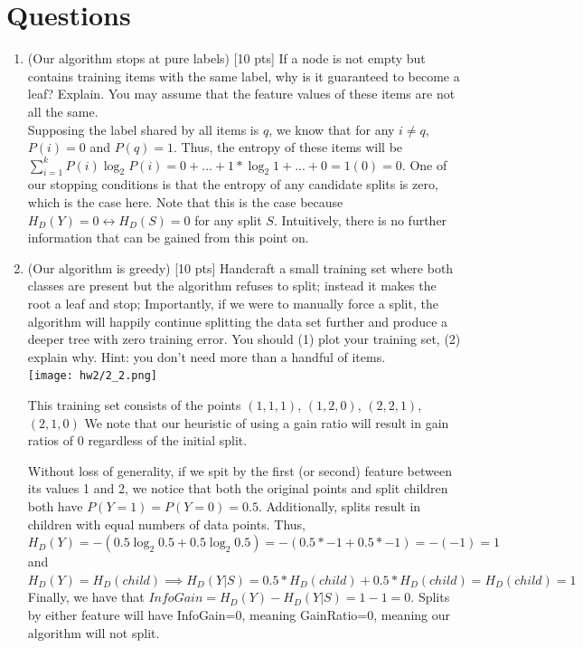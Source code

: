 \documentclass[a4paper]{article}
\theoremstyle{definition}
\begin{document}
\section{Questions}
\begin{enumerate}
\item (Our algorithm stops at pure labels) [10 pts] If a node is not empty but contains training items with the same label, why is it guaranteed to become a leaf?  Explain. You may assume that the feature values of these items are not all the same. \\

Supposing the label shared by all items is $q$, we know that for any $i \neq q$, $P(i) = 0$ and $P(q) = 1$. Thus, the entropy of these items will be $\sum_{i=1}^{k} P(i) \log_{2}{P(i)} = 0 + ... + 1 * \log_{2}{1} + ... + 0 = 1(0) = 0$. 
One of our stopping conditions is that the entropy of any candidate splits is zero, which is the case here. Note that this is the case because $H_D(Y) = 0 \longleftrightarrow H_D(S) = 0$ for any split $S$. Intuitively, there is no further information that can be gained from this point on.

\item (Our algorithm is greedy)  [10 pts] Handcraft a small training set where both classes are present but the algorithm refuses to split; instead it makes the root a leaf and stop;
Importantly, if we were to manually force a split, the algorithm will happily continue splitting the data set further and produce a deeper tree with zero training error.
You should (1) plot your training set, (2) explain why.  Hint: you don't need more than a handful of items. \\

\texttt{[image: hw2/2\_2.png]}

This training set consists of the points $(1,1,1)$, $(1,2,0)$, $(2,2,1)$, $(2,1,0)$
We note that our heuristic of using a gain ratio will result in gain ratios of 0 regardless of the initial split. 

Without loss of generality, if we spit by the first (or second) feature between its values 1 and 2, we notice that both the original points and split children both have $P(Y=1) = P(Y=0) = 0.5$. Additionally, splits result in children with equal numbers of data points.
Thus, \\$H_D(Y) = -(0.5 \log_{2}{0.5} + 0.5 \log_{2}{0.5}) = -(0.5*-1 + 0.5*-1) = -(-1) = 1$ and\\
$H_D(Y) = H_D(child) \implies H_D(Y | S) = 0.5 * H_D(child) + 0.5 * H_D(child) = H_D(child) = 1$
\\Finally, we have that $InfoGain = H_D(Y) - H_D(Y | S) = 1 - 1 = 0$.
Splits by either feature will have InfoGain=0, meaning GainRatio=0, meaning our algorithm will not split.


\end{enumerate}
\end{document}
